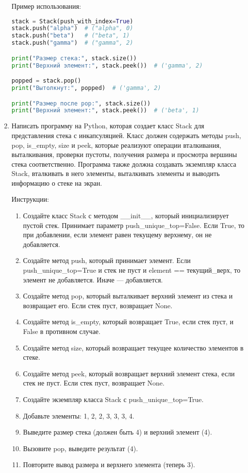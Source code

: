 \begin{enumerate}
Пример использования:
\begin{lstlisting}[language=Python]
stack = Stack(push_with_index=True)
stack.push("alpha")  # ("alpha", 0)
stack.push("beta")   # ("beta", 1)
stack.push("gamma")  # ("gamma", 2)

print("Размер стека:", stack.size())
print("Верхний элемент:", stack.peek())  # ('gamma', 2)

popped = stack.pop()
print("Вытолкнут:", popped)  # ('gamma', 2)

print("Размер после pop:", stack.size())
print("Верхний элемент:", stack.peek())  # ('beta', 1)
\end{lstlisting}

\item Написать программу на Python, которая создает класс Stack для представления стека с инкапсуляцией. Класс должен содержать методы push, pop, is\_empty, size и peek, которые реализуют операции вталкивания, выталкивания, проверки пустоты, получения размера и просмотра вершины стека соответственно. Программа также должна создавать экземпляр класса Stack, вталкивать в него элементы, выталкивать элементы и выводить информацию о стеке на экран.

Инструкции:
\begin{enumerate}
    \item Создайте класс Stack с методом \_\_init\_\_, который инициализирует пустой стек. Принимает параметр push\_unique\_top=False. Если True, то при добавлении, если элемент равен текущему верхнему, он не добавляется.
    \item Создайте метод push, который принимает элемент. Если push\_unique\_top=True и стек не пуст и element == текущий\_верх, то элемент не добавляется. Иначе — добавляется.
    \item Создайте метод pop, который выталкивает верхний элемент из стека и возвращает его. Если стек пуст, возвращает None.
    \item Создайте метод is\_empty, который возвращает True, если стек пуст, и False в противном случае.
    \item Создайте метод size, который возвращает текущее количество элементов в стеке.
    \item Создайте метод peek, который возвращает верхний элемент стека, если стек не пуст. Если стек пуст, возвращает None.
    \item Создайте экземпляр класса Stack с push\_unique\_top=True.
    \item Добавьте элементы: 1, 2, 2, 3, 3, 3, 4.
    \item Выведите размер стека (должен быть 4) и верхний элемент (4).
    \item Вызовите pop, выведите результат (4).
    \item Повторите вывод размера и верхнего элемента (теперь 3).
\end{enumerate}


\end{enumerate}
